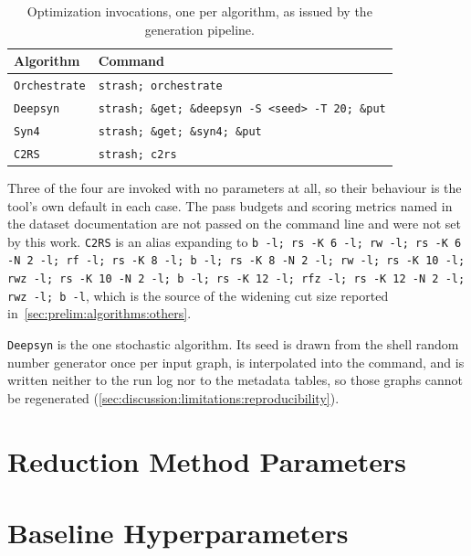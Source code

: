 \begin{table}[htbp]
\centering
\caption{Optimization invocations, one per algorithm, as issued by the generation pipeline.}
\label{tab:apx:algorithms}
\footnotesize
\begin{tabular}{ll}
\toprule
\textbf{Algorithm} & \textbf{Command} \\
\midrule
\texttt{Orchestrate} & \texttt{strash; orchestrate} \\
\texttt{Deepsyn}     & \texttt{strash; \&get; \&deepsyn -S <seed> -T 20; \&put} \\
\texttt{Syn4}        & \texttt{strash; \&get; \&syn4; \&put} \\
\texttt{C2RS}        & \texttt{strash; c2rs} \\
\bottomrule
\end{tabular}
\end{table}

Three of the four are invoked with no parameters at all, so their behaviour is the tool's
own default in each case. The pass budgets and scoring metrics named in the dataset
documentation are not passed on the command line and were not set by this work.
\texttt{C2RS} is an alias expanding to
\texttt{b -l; rs -K 6 -l; rw -l; rs -K 6 -N 2 -l; rf -l; rs -K 8 -l; b -l;
rs -K 8 -N 2 -l; rw -l; rs -K 10 -l; rwz -l; rs -K 10 -N 2 -l; b -l; rs -K 12 -l;
rfz -l; rs -K 12 -N 2 -l; rwz -l; b -l}, which is the source of the widening cut size
reported in~\ref{sec:prelim:algorithms:others}.

\texttt{Deepsyn} is the one stochastic algorithm. Its seed is drawn from the shell random
number generator once per input graph, is interpolated into the command, and is written
neither to the run log nor to the metadata tables, so those graphs cannot be regenerated
(\ref{sec:discussion:limitations:reproducibility}).

\section{Reduction Method Parameters}
\label{sec:apx:params}

\section{Baseline Hyperparameters}
\label{sec:apx:baselines}

